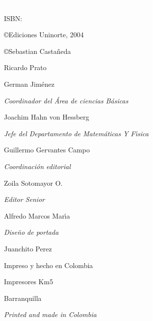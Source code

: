 \documentclass{article}%
\begin{document}
\thispagestyle{empty} \textcolor{white}{.}

\vspace{0.3in}



ISBN:

\bigskip

\bigskip

\bigskip

\copyright Ediciones Uninorte, 2004

\copyright Sebastian Casta\~{n}eda

\quad Ricardo Prato

\quad German Jim\'{e}nez

\vspace{1in}

\bigskip

\textit{Coordinador del \'{A}rea de ciencias B\'{a}sicas}

Joachim Hahn von Hessberg

\bigskip

\textit{Jefe del Departamento de Matem\'{a}ticas Y F\'{\i}sica}

Guillermo Gervantes Campo

\bigskip

\textit{Coordinaci\'{o}n editorial}

Zoila Sotomayor O.

\bigskip

\textit{Editor Senior}

Alfredo Marcos Mar\'{\i}a

\vspace{1in}

\bigskip

\textit{Dise\~{n}o de portada}

Juanchito Perez

\bigskip

\bigskip

\bigskip

Impreso y hecho en Colombia

Impresores Km5

Barranquilla

\textit{Printed and made in Colombia}
\end{document}

